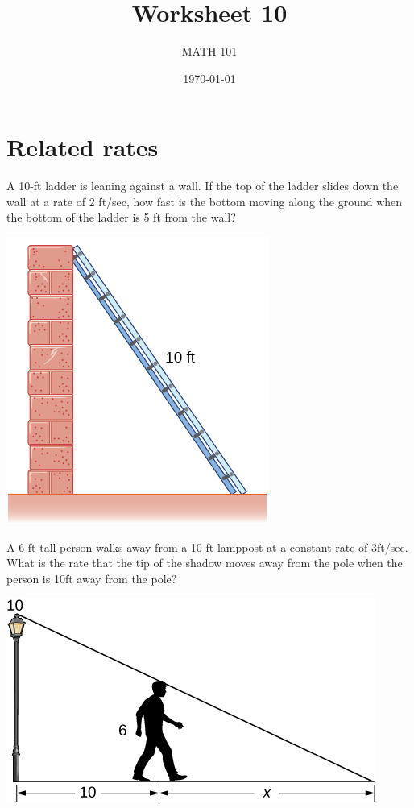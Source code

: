 \documentclass[12pt]{amsart}
\title{ Worksheet 10}
\author{MATH 101}
\date{\today}
\begin{document}
\maketitle

\section*{Related rates}
\begin{question}
	A 10-ft ladder is leaning against a wall. If the top of the ladder slides down the wall at a rate of 2 ft/sec, how fast is the bottom moving along the ground when the bottom of the ladder is 5 ft from the wall?
	\begin{center}
		\includegraphics{fig1.jpeg}
	\end{center}
\end{question}

\newpage

\begin{question}
	A 6-ft-tall person walks away from a 10-ft lamppost at a constant rate of  3ft/sec.
	What is the rate that the tip of the shadow moves away from the pole when the person is  10ft
	away from the pole?
	\begin{center}
		\includegraphics{fig2.jpeg}
	\end{center}
\end{question}
\end{document}
